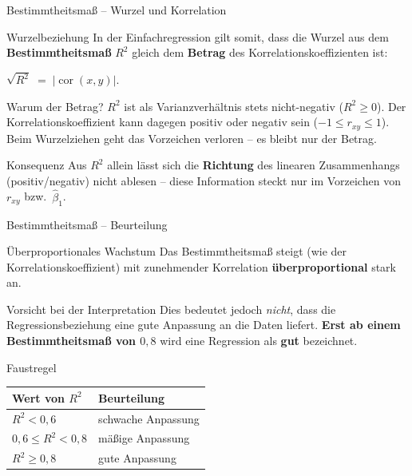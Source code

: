 \documentclass[aspectratio=169,11pt]{beamer}
\begin{document}
\begin{frame}{Bestimmtheitsmaß -- Wurzel und Korrelation}
  \begin{block}{Wurzelbeziehung}
    In der Einfachregression gilt somit, dass die Wurzel aus dem
    \textbf{Bestimmtheitsmaß} $R^{2}$ gleich dem \textbf{Betrag} des
    Korrelations\-koeffizienten ist:
    \begin{center}
      $\displaystyle
        \sqrt{R^{2}} \;=\; \lvert \operatorname{cor}(x,y) \rvert.$
    \end{center}
  \end{block}

  \begin{exampleblock}{Warum der Betrag?}
    $R^{2}$ ist als Varianzverhältnis stets nicht-negativ ($R^{2} \ge 0$).
    Der Korrelationskoeffizient kann dagegen positiv oder negativ
    sein ($-1 \le r_{xy} \le 1$). Beim Wurzelziehen geht das
    Vorzeichen verloren -- es bleibt nur der Betrag.
  \end{exampleblock}

  \begin{alertblock}{Konsequenz}
    Aus $R^{2}$ allein lässt sich die \textbf{Richtung} des linearen
    Zusammenhangs (positiv/negativ) nicht ablesen -- diese
    Information steckt nur im Vorzeichen von $r_{xy}$ bzw.\ $\hat{\beta}_1$.
  \end{alertblock}
\end{frame}

\begin{frame}{Bestimmtheitsmaß -- Beurteilung}
  \small
  \begin{block}{Überproportionales Wachstum}
    Das Bestimmtheitsmaß steigt (wie der Korrelationskoeffizient) mit
    zunehmender Korrelation \textbf{überproportional} stark an.
  \end{block}

  \begin{alertblock}{Vorsicht bei der Interpretation}
    Dies bedeutet jedoch \emph{nicht}, dass die Regressionsbeziehung
    eine gute Anpassung an die Daten liefert. \textbf{Erst ab einem
    Bestimmtheitsmaß von $0{,}8$} wird eine Regression als
    \textbf{gut} bezeichnet.
  \end{alertblock}

  \begin{exampleblock}{Faustregel}
    \begin{tabular}{ll}
      \toprule
      \textbf{Wert von $R^{2}$} & \textbf{Beurteilung} \\
      \midrule
      $R^{2} < 0{,}6$           & schwache Anpassung \\
      $0{,}6 \le R^{2} < 0{,}8$ & mäßige Anpassung \\
      $R^{2} \ge 0{,}8$         & gute Anpassung \\
      \bottomrule
    \end{tabular}
  \end{exampleblock}
\end{frame}
\end{document}

